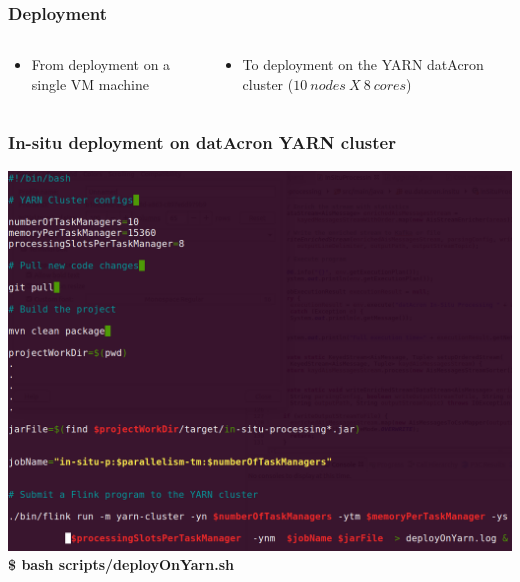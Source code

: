 \begin{frame}
\frametitle{Deployment}
\begin{columns}
\begin{column}{0.5\textwidth}
  \begin{itemize}
  \item<1-> From deployment on a single VM machine 
  \end{itemize}
\end{column}
\begin{column}{0.5\textwidth}  
  \begin{itemize}
  \item<1-> To deployment on the YARN datAcron cluster ($10\ nodes\ X\ 8\ cores$)
  \end{itemize}
\end{column}
\end{columns}
\end{frame}





\frame
{	
	\frametitle{In-situ deployment on datAcron YARN cluster}

	\begin{center}
		
		\includegraphics[width=.7\textwidth,height=.5\linewidth]{figures/deploy.png}\\
		\textbf{\$ bash scripts/deployOnYarn.sh}
	\end{center}


}


